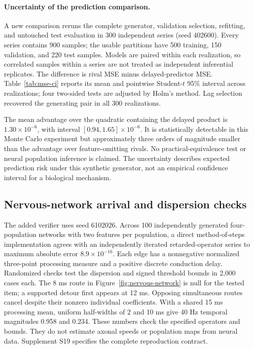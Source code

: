 \documentclass[submission,nolinenumbers]{esj}
\begin{document}
\paragraph{Uncertainty of the prediction comparison.} A new comparison reruns the complete generator, validation selection, refitting, and untouched test evaluation in 300 independent series (seed 402600). Every series contains 900 samples; the usable partitions have 500 training, 150 validation, and 220 test samples. Models are paired within each realization, so correlated samples within a series are not treated as independent inferential replicates. The difference is rival MSE minus delayed-predictor MSE. Table~\ref{tab:mse-ci} reports its mean and pointwise Student-$t$ 95\% interval across realizations; four two-sided tests are adjusted by Holm's method. Lag selection recovered the generating pair in all 300 realizations.


The mean advantage over the quadratic containing the delayed product is $1.30\times10^{-6}$, with interval $[0.94,1.65]\times10^{-6}$. It is statistically detectable in this Monte Carlo experiment but approximately three orders of magnitude smaller than the advantage over feature-omitting rivals. No practical-equivalence test or neural population inference is claimed. The uncertainty describes expected prediction risk under this synthetic generator, not an empirical confidence interval for a biological mechanism.

\subsection{Nervous-network arrival and dispersion checks}\label{sec:nervous-checks}
The added verifier uses seed 6102026. Across 100 independently generated four-population networks with two features per population, a direct method-of-steps implementation agrees with an independently iterated retarded-operator series to maximum absolute error $8.9\times10^{-16}$. Each edge has a nonnegative normalized three-point processing measure and a positive discrete conduction delay. Randomized checks test the dispersion and signed threshold bounds in 2,000 cases each. The 8 ms route in Figure~\ref{fig:nervous-network} is null for the tested item; a supported detour first appears at 12 ms. Opposing simultaneous routes cancel despite their nonzero individual coefficients. With a shared 15 ms processing mean, uniform half-widths of 2 and 10 ms give 40 Hz temporal magnitudes 0.958 and 0.234. These numbers check the specified operators and bounds. They do not estimate axonal speeds or population maps from neural data. Supplement S19 specifies the complete reproduction contract.
\end{document}
